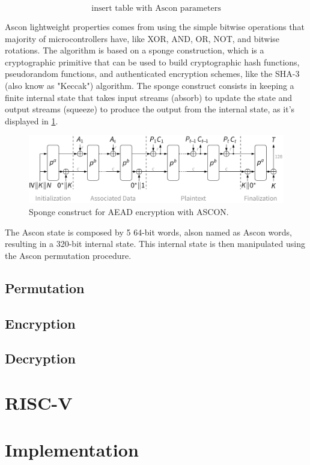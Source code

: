 \documentclass[11pt,twoside]{article}
\begin{document}
$$ \textrm{insert table with Ascon parameters} $$

Ascon lightweight properties comes from using the simple bitwise operations that majority of microcontrollers have, like XOR, AND, OR, NOT, and bitwise rotations. The algorithm is based on a sponge construction, which is a cryptographic primitive that can be used to build cryptographic hash functions, pseudorandom functions, and authenticated encryption schemes, like the SHA-3 (also know as "Keccak") \cite{bertoni2015keccak} algorithm. The sponge construct consists in keeping a finite internal state that takes input streams (absorb) to update the state and output streams (squeeze) to produce the output from the internal state, as it's displayed in \cref{fig:1}.

\begin{figure}[h]
  \centering
  \includegraphics[width=.64\textwidth]{assets/aead_encrypt.png}
  \caption{Sponge construct for AEAD encryption with ASCON.}
  \label{fig:1}
\end{figure}


The Ascon state is composed by 5 64-bit words, alson named as Ascon words, resulting in a 320-bit internal state. This internal state is then manipulated using the Ascon permutation procedure.

\subsection{Permutation}

\subsection{Encryption}

\subsection{Decryption}

\section{RISC-V}

\section{Implementation}
\end{document}
